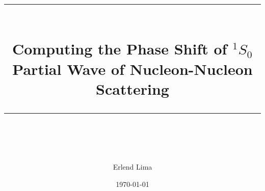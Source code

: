 \newcommand{\horrule}[1]{\rule{\linewidth}{#1}} %

\titlehead{\texttt{[image: Figures/MN\_FYSISK\_Seal\_A\_ENG.pdf]}}
\title{
\horrule{0.5pt} \\[0.4cm]
\huge Computing the Phase Shift of \(^{1}S_{0}\) Partial Wave of Nucleon-Nucleon Scattering

\horrule{0.5pt} \\[0.5cm]}

\author{Erlend Lima}
\date{\today}

\maketitle
